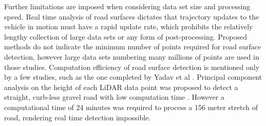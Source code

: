 \documentclass[journal,onecolumn]{IEEEtran}
\begin{document}
	{Further limitations are imposed when considering data set size and processing speed. Real time analysis of road surfaces dictates that trajectory updates to the vehicle in motion must have a rapid update rate, which prohibits the relatively lengthy collection of large data sets or any form of post-processing. Proposed methods \cite{yadav_extraction_2017,yadav_road_2018,yadav_rural_2018,yadav_pole-shaped_2015,miyazaki_line-based_2014,yang_semi-automated_2013,liu_new_2013,qiu_fast_2016} do not indicate the minimum number of points required for road surface detection, however large data sets numbering many millions of points are used in those studies. Computation efficiency of road surface detection is mentioned only by a few studies, such as the one completed by Yadav et al \cite{yadav_road_2018}. Principal component analysis on the height of each LiDAR data point was proposed to detect a straight, curb-less gravel road with low computation time \cite{yadav_road_2018}. However a computational time of 24 minutes was required to process a 156 meter stretch of road, rendering real time detection impossible.}
	
\end{document}
